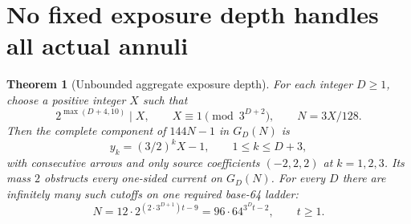 \documentclass[11pt]{article}
\newtheorem{theorem}{Theorem}
\begin{document}
\section{No fixed exposure depth handles all actual annuli}
\begin{theorem}[Unbounded aggregate exposure depth]\label{thm:unboundeddepth}
For each integer $D\ge1$, choose a positive integer $X$ such that
\[
 2^{\max(D+4,10)}\mid X,\qquad X\equiv1\pmod{3^{D+2}},
 \qquad N=3X/128.
\]
Then the complete component of $144N-1$ in $G_D(N)$ is
\[
 y_k=(3/2)^kX-1,\qquad 1\le k\le D+3,
\]
with consecutive arrows and only source coefficients $(-2,2,2)$
at $k=1,2,3$. Its mass $2$ obstructs every one-sided current on $G_D(N)$.
For every $D$ there are infinitely many such cutoffs on one required
base-64 ladder:
\[
 N=12\cdot2^{(2\cdot3^{D+1})t-9}
   =96\cdot64^{3^Dt-2},\qquad t\ge1.
\]
\end{theorem}
\end{document}
